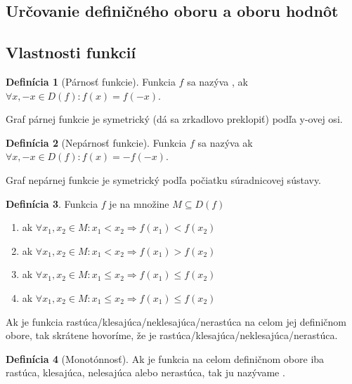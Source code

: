 \documentclass[12pt, twopage]{article}
\theoremstyle{definition}
\newtheorem{definition}{Definícia}
\begin{document}
	\subsection{Určovanie definičného oboru a oboru hodnôt}
	
	\subsection{Vlastnosti funkcií}
	
	\begin{definition}[Párnosť funkcie]
		Funkcia $f$ sa nazýva , ak $\forall x, -x \in D(f): f(x) = f(-x)$.
	\end{definition}
	Graf párnej funkcie je symetrický (dá sa zrkadlovo preklopiť) podľa y-ovej osi.
	
	\begin{definition}[Nepárnosť funkcie]
		Funkcia $f$ sa nazýva  ak $\forall x, -x \in D(f): f(x) = -f(-x)$.
	\end{definition}
	
	Graf nepárnej funkcie je symetrický podľa počiatku súradnicovej sústavy.
	
	\begin{definition}
		Funkcia $f$ je na množine $M \subseteq D(f)$ \\
		\begin{enumerate}
			\item {} ak $\forall x_1, x_2 \in M: x_1 < x_2 \Rightarrow f(x_1) < f(x_2)$
			\item {} ak $\forall x_1, x_2 \in M: x_1 < x_2 \Rightarrow f(x_1) > f(x_2)$
			\item {} ak $\forall x_1, x_2 \in M: x_1 \le x_2 \Rightarrow f(x_1) \le f(x_2)$
			\item {} ak $\forall x_1, x_2 \in M: x_1 \le x_2 \Rightarrow f(x_1) \le f(x_2)$
		\end{enumerate}
 	\end{definition}
 	
 	Ak je funkcia rastúca/klesajúca/neklesajúca/nerastúca na celom jej definičnom obore, tak skrátene hovoríme, že je rastúca/klesajúca/neklesajúca/nerastúca.
 	
 	\begin{definition}[Monotónnosť]
 		Ak je funkcia na celom definičnom obore iba rastúca, klesajúca, nelesajúca alebo nerastúca, tak ju nazývame .
 	\end{definition}
 	
\end{document}
